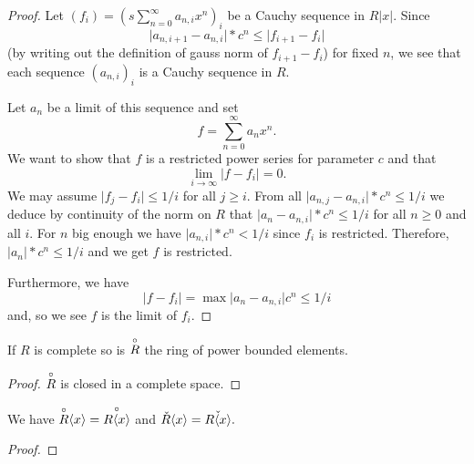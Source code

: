 \begin{proof}
  Let $(f_i) = (s\sum_{n = 0}^\infty a_{n,i} x^n)_i$ be a Cauchy sequence in $R\lvert x \rvert$.
  Since
  \[
  \lvert a_{n,i+1} - a_{n,i} \rvert * c^n \leq \lvert f_{i+1} - f_i \rvert
  \]
  (by writing out the definition of gauss norm of $f_{i+1} - f_i$) for fixed $n$, we see that each
  sequence $(a_{n,i})_i$ is a Cauchy sequence in $R$.

  Let $a_n$ be a limit of this sequence and set
  \[
    f = \sum_{n = 0}^\infty a_n x^n.
  \]
  We want to show that $f$ is a restricted power series for parameter $c$ and that
  \[
    \lim_{i \to \infty} \lvert f - f_i \rvert = 0.
  \]
  We may assume $\lvert f_j - f_i \rvert \leq 1 / i$ for all $j \geq i$.
  From all $\lvert a_{n,j} - a_{n,i} \rvert * c^n \leq 1/i$ we deduce by continuity of the norm on $R$
  that $\lvert a_n - a_{n,i} \rvert * c^n \leq 1 / i$ for all $n \geq 0$ and all $i$. For $n$ big enough
  we have $\lvert a_{n,i} \rvert *c^n < 1 /i$ since $f_i$ is restricted.
  Therefore, $\lvert a_n \rvert * c^n \leq 1/i$ and we get $f$ is restricted.

  Furthermore, we have
  \[
    \lvert f - f_i \rvert = \max \lvert a_n - a_{n,i} \rvert c^n \leq 1/i
  \]
  and, so we see $f$ is the limit of $f_i$.
\end{proof}

\begin{lemma}
  If $R$ is complete so is $\overset{\circ}{R}$ the ring of power bounded elements.
\end{lemma}

\begin{proof}
  $\overset{\circ}{R}$ is closed in a complete space.
\end{proof}

\begin{lemma}
  We have $\overset{\circ}{R} \langle x \rangle = \overset{\circ}{R \langle x \rangle}$ and
  $\check{R} \langle x \rangle = \check{R \langle x \rangle}.$
\end{lemma}

\begin{proof}
\end{proof}


